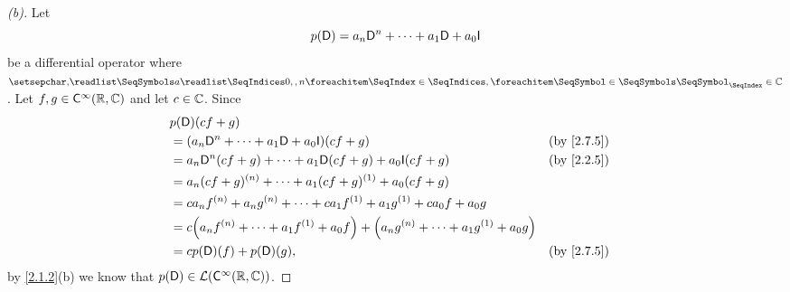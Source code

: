 \begin{proof}[(b)]
  Let
  \[
    p(\Dop) = a_n \Dop^n + \cdots + a_1 \Dop + a_0 \IT
  \]
  be a differential operator where \(\seq{a}{0,,n} \in \C\).
  Let \(f, g \in \cfs[\infty](\R, \C)\) and let \(c \in \mathbb{C}\).
  Since
  \begin{align*}
     & p(\Dop)(cf + g)                                                                                                                     \\
     & = \pa{a_n \Dop^n + \cdots + a_1 \Dop + a_0 \IT}(cf + g)                                               &  & \text{(by \cref{2.7.5})} \\
     & = a_n \Dop^n(cf + g) + \cdots + a_1 \Dop(cf + g) + a_0 \IT(cf + g)                                    &  & \text{(by \cref{2.2.5})} \\
     & = a_n (cf + g)^{(n)} + \cdots + a_1 (cf + g)^{(1)} + a_0 (cf + g)                                                                   \\
     & = c a_n f^{(n)} + a_n g^{(n)} + \cdots + c a_1 f^{(1)} + a_1 g^{(1)} + c a_0 f + a_0 g                                              \\
     & = c \pa{a_n f^{(n)} + \cdots + a_1 f^{(1)} + a_0 f} + \pa{a_n g^{(n)} + \cdots + a_1 g^{(1)} + a_0 g}                               \\
     & = c p(\Dop)(f) + p(\Dop)(g),                                                                          &  & \text{(by \cref{2.7.5})}
  \end{align*}
  by \cref{2.1.2}(b) we know that \(p(\Dop) \in \ls(\cfs[\infty](\R, \C))\).
\end{proof}
